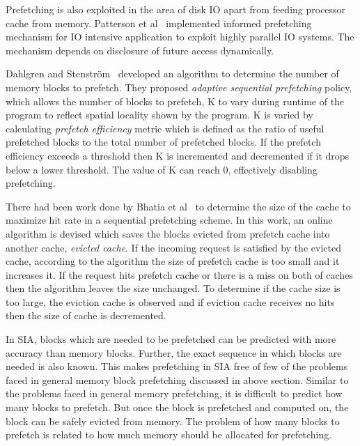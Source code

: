Prefetching is also exploited in the area of disk IO apart from feeding processor cache
from memory. Patterson et al~\cite{Patterson1994} implemented informed prefetching
mechanism for IO intensive application to exploit highly parallel IO systems. The
mechanism depends on disclosure of future access dynamically.

Dahlgren and Stenström~\cite{Dahlgren1993} developed an algorithm to determine the
number of memory blocks to prefetch. They proposed
\textit{adaptive sequential prefetching} policy, which allows the number of blocks
to prefetch, K to vary during runtime of the program to reflect spatial locality
shown by the program. K is varied by calculating \textit{prefetch efficiency} metric
which is defined as the ratio of useful prefetched blocks to the total number of
prefetched blocks. If the prefetch efficiency exceeds a threshold then K is
incremented and decremented if it drops below a lower threshold. The value of K
can reach 0, effectively disabling prefetching.

There had been work done by Bhatia et al~\cite{Bhatia2010} to determine the size of
the cache to maximize hit rate in a sequential prefetching scheme. In this work, an
online algorithm is devised which saves the blocks evicted from prefetch cache
into another cache, \textit{evicted cache}. If the incoming request is satisfied
by the evicted cache, according to the algorithm the size of prefetch cache is too
small and it increases it. If the request hits prefetch cache or there is a miss
on both of caches then the algorithm leaves the size unchanged. To determine if
the cache size is too large, the eviction cache is observed and if eviction cache
receives no hits then the size of cache is decremented.

In SIA, blocks which are needed to be prefetched can be predicted with more accuracy
than memory blocks. Further, the exact sequence in which blocks are needed is also known.
This makes prefetching in SIA free of few of the problems faced in general memory
block prefetching discussed in above section. Similar to the problems faced in general
memory prefetching, it is difficult to predict how many blocks to prefetch. But
once the block is prefetched and computed on, the block can be safely evicted from
memory. The problem of how many blocks to prefetch is related to how much memory
should be allocated for prefetching.
